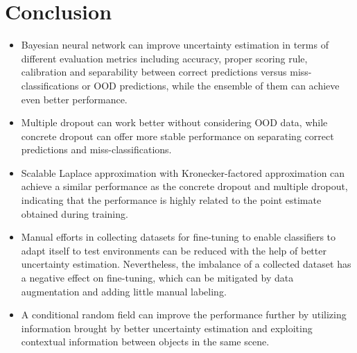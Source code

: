 \section{Conclusion}
\begin{itemize}
	\item Bayesian neural network can improve uncertainty estimation in terms of different evaluation metrics including accuracy, proper scoring rule, calibration and separability between correct predictions versus miss-classifications or OOD predictions, while the ensemble of them can achieve even better performance.
	
	\item Multiple dropout can work better without considering OOD data, while concrete dropout can offer more stable performance on separating correct predictions and miss-classifications.
	
	\item Scalable Laplace approximation with Kronecker-factored approximation can achieve a similar performance as the concrete dropout and multiple dropout, indicating that the performance is highly related to the point estimate obtained during training.
	
	\item Manual efforts in collecting datasets for fine-tuning to enable classifiers to adapt itself to test environments can be reduced with the help of better uncertainty estimation. Nevertheless, the imbalance of a collected dataset has a negative effect on fine-tuning, which can be mitigated by data augmentation and adding little manual labeling.
	
	\item A conditional random field can improve the performance further by utilizing information brought by better uncertainty estimation and exploiting contextual information between objects in the same scene.
	
\end{itemize}


